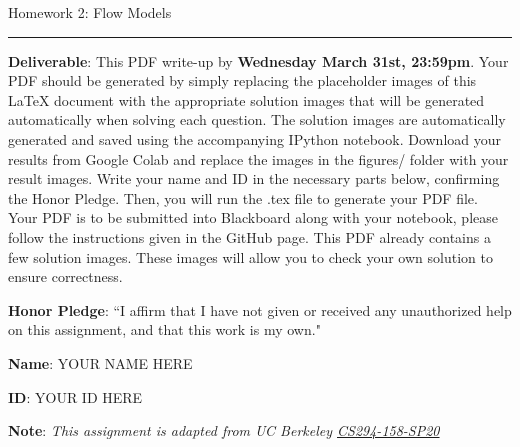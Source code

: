 \documentclass{article}
\newcommand{\ruleskip}{\bigskip\hrule\bigskip}
\begin{document}
\pagestyle{myheadings} 

{\huge
\noindent Homework 2: Flow Models}
\ruleskip

{\bf Deliverable}: This PDF write-up by {\bf Wednesday March 31st, 23:59pm}.  Your PDF should be generated by simply replacing the placeholder images of this LaTeX document with the appropriate solution images that will be generated automatically when solving each question. The solution images are automatically generated and saved using the accompanying IPython notebook.  Download your results from Google Colab and replace the images in the figures/ folder with your result images. Write your name and ID in the necessary parts below, confirming the Honor Pledge. Then, you will run the .tex file to generate your PDF file. Your PDF is to be submitted into Blackboard along with your notebook, please follow the instructions given in the GitHub page. This PDF already contains a few solution images.  These images will allow you to check your own solution to ensure correctness.

{\bf Honor Pledge}: ``I affirm that I have not given or received any unauthorized help on this assignment, and that this work is my own."

{\bf Name}: YOUR NAME HERE

{\bf ID}: YOUR ID HERE

\vspace{.1in}

{\bf Note}: \textit{This assignment is adapted from UC Berkeley \href{https://sites.google.com/view/berkeley-cs294-158-sp20/home}{CS294-158-SP20}}
\vspace{.2in}

\end{document}
